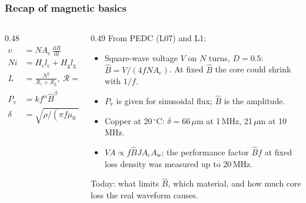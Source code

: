 \begin{frame}
	\frametitle{Recap of magnetic basics}
	\begin{columns}[T]
		\begin{column}{0.48\textwidth}
			\small
			\begin{align*}
				v                     & =N A_\mathrm{c}\,\frac{\mathrm{d}B}{\mathrm{d}t}                                   &  & \text{Faraday}       \\
				N i                   & =H_\mathrm{c}l_\mathrm{c}+H_\mathrm{g}l_\mathrm{g}                                   &  & \text{Amp\`ere}      \\
				L                     & =\frac{N^2}{\mathcal{R}_\mathrm{c}+\mathcal{R}_\mathrm{g}},\ \mathcal{R}=\frac{l}{\mu A} &  &                      \\
				P_\mathrm{v}          & =k f^{\alpha}\hat{B}^{\beta}                                                          &  & \text{Steinmetz}     \\
				\delta                & =\sqrt{\rho/(\pi f\mu_0)}                                                             &  & \text{skin depth}
			\end{align*}
		\end{column}
		\begin{column}{0.49\textwidth}
			\small
			From PEDC (L07) and L1:
			\begin{itemize}
				\item Square-wave voltage $V$ on $N$ turns, $D=0.5$: $\hat{B}=V/(4fNA_\mathrm{c})$. At fixed $\hat{B}$ the core could shrink with $1/f$.
				\item $P_\mathrm{v}$ is given for sinusoidal flux; $\hat{B}$ is the amplitude.
				\item Copper at 20\,$^\circ$C: $\delta=66\,\mu$m at 1\,MHz, 21\,$\mu$m at 10\,MHz.
				\item $VA\propto f\hat{B}JA_\mathrm{c}A_\mathrm{w}$; the performance factor $\hat{B}f$ at fixed loss density was measured up to 20\,MHz.
			\end{itemize}
			Today: what limits $\hat{B}$, which material, and how much core loss the real waveform causes.
		\end{column}
	\end{columns}
\end{frame}

